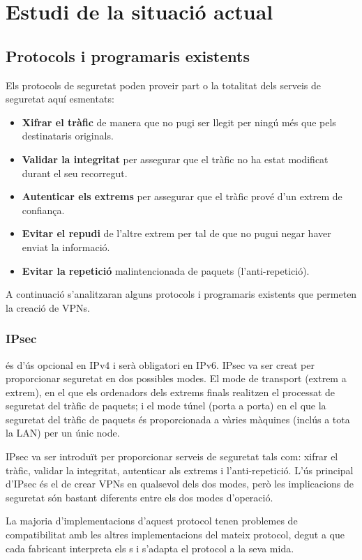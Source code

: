 \chapter{Estudi de la situació actual}
\section{Protocols i programaris existents}
Els protocols de seguretat poden proveir part o la totalitat dels serveis de seguretat aquí esmentats:
\begin{itemize}
\item \textbf{Xifrar el tràfic} de manera que no pugi ser llegit per ningú més que pels destinataris originals.
\item \textbf{Validar la integritat} per assegurar que el tràfic no ha estat modificat durant el seu recorregut.
\item \textbf{Autenticar els extrems} per assegurar que el tràfic prové d'un extrem de confiança.
\item \textbf{Evitar el repudi} de l'altre extrem per tal de que no pugui negar haver enviat la informació.
\item \textbf{Evitar la repetició} malintencionada de paquets (l'anti-repetició).
\end{itemize}

A continuació s'analitzaran alguns protocols i programaris existents que permeten la creació de VPNs.
\subsection{IPsec}
 és d'ús opcional en IPv4 i serà obligatori en IPv6. IPsec va ser creat per proporcionar seguretat en dos possibles modes. El mode de transport (extrem a extrem), en el que els ordenadors dels extrems finals realitzen el processat de seguretat del tràfic de paquets; i el mode túnel (porta a porta) en el que la seguretat del tràfic de paquets és proporcionada a vàries màquines (inclús a tota la LAN) per un únic node.

IPsec va ser introduït per proporcionar serveis de seguretat tals com: xifrar el tràfic, validar la integritat, autenticar als extrems i l'anti-repetició. L'ús principal d'IPsec és el de crear VPNs en qualsevol dels dos modes, però les implicacions de seguretat són bastant diferents entre els dos modes d'operació.

La majoria d'implementacions d'aquest protocol tenen problemes de compatibilitat amb les altres implementacions del mateix protocol, degut a que cada fabricant interpreta els \rfckeyword{}s i s'adapta el protocol a la seva mida.

